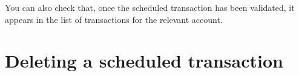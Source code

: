 You can also check that, once the scheduled transaction has been validated, it appears in the list of transactions for the relevant account.


\section{Deleting a scheduled transaction\label{plannedtransactions-remove}}


